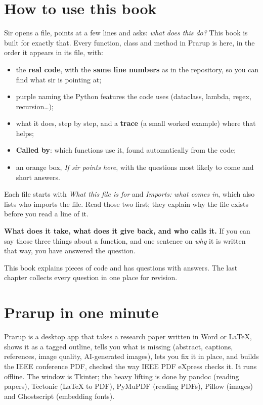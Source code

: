 \chapter{How to use this book}

Sir opens a file, points at a few lines and asks: \emph{what does this do?} This book is built for exactly that.
Every function, class and method in Prarup is here, in the order it appears in its file, with:

\begin{itemize}
\item the \textbf{real code}, with the \textbf{same line numbers} as in the repository, so you can find what sir is pointing at;
\item purple  naming the Python features the code uses (dataclass, lambda, regex, recursion\dots);
\item what it does, step by step, and a \textbf{trace} (a small worked example) where that helps;
\item \textcolor{sage}{\textbf{Called by}}: which functions use it, found automatically from the code;
\item an orange box, \emph{If sir points here}, with the questions most likely to come and short answers.
\end{itemize}

Each file starts with \emph{What this file is for} and \emph{Imports: what comes in}, which also lists who imports the file.
Read those two first; they explain why the file exists before you read a line of it.

\begin{keyidea}
\textbf{What does it take, what does it give back, and who calls it.} If you can say those three things about a function,
and one sentence on \emph{why} it is written that way, you have answered the question.
\end{keyidea}

This book explains \unitsTotal{} pieces of code and has \questionsTotal{} questions with answers.
The last chapter collects every question in one place for revision.

\chapter{Prarup in one minute}

\begin{keyidea}
Prarup is a desktop app that takes a research paper written in Word or LaTeX, shows it as a tagged outline,
tells you what is missing (abstract, captions, references, image quality, AI-generated images),
lets you fix it in place, and builds the IEEE conference PDF, checked the way IEEE PDF eXpress checks it.
It runs offline. The window is Tkinter; the heavy lifting is done by pandoc (reading papers), Tectonic (LaTeX to PDF),
PyMuPDF (reading PDFs), Pillow (images) and Ghostscript (embedding fonts).
\end{keyidea}

